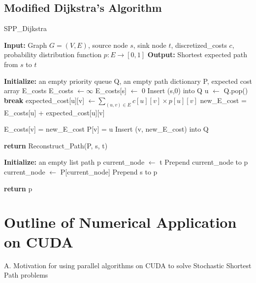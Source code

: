 \documentclass{article}
\begin{document}
\subsection{Modified Dijkstra's Algorithm}

\begin{algorithm}[H]
  \caption{SPP\_Dijkstra}
  \begin{algorithmic}[1]
  \State \textbf{Input:} Graph $G=(V,E)$, source node $s$, sink node $t$, discretized\_costs $c$, probability distribution function $p:E\rightarrow[0,1]$
  \State \textbf{Output:} Shortest expected path from $s$ to $t$
  \State
  
  \State \textbf{Initialize:} an empty priority queue Q, an empty path dictionary P, expected cost array E\_costs
  \State E\_costs $ \gets \infty$
  \EndFor
  \State E\_costs[s] $\gets$ 0
  \State Insert (s,0) into Q
  \State
  \State u $\gets$ Q.pop()
  \State \textbf{break}
  \EndIf
  \State
  \State expected\_cost[u][v] $\gets \sum_{(u,v) \in E}c[u][v]\times p[u][v]$
  \State new\_E\_cost = E\_costs[u] + expected\_cost[u][v]
  
  \State E\_costs[v] = new\_E\_cost
  \State P[v] = u
  \State Insert (v, new\_E\_cost) into Q
  
  \EndIf
  
  \EndFor
  \EndWhile
  
  \State \textbf{return} Reconstruct\_Path(P, s, t)
  
  \EndProcedure
  \State
  \State \textbf{Initialize:} an empty list path p
  \State current\_node $\gets$ t
  \State Prepend current\_node to p
  \State current\_node $\gets$ P[current\_node]
  \State
  \State Prepend s to p
  
  \EndWhile
  \State \textbf{return} p
  \EndProcedure
  
  
  \end{algorithmic}
  \end{algorithm}


\section{Outline of Numerical Application on CUDA}


A. Motivation for using parallel algorithms on CUDA to solve Stochastic Shortest Path problems
\end{document}
